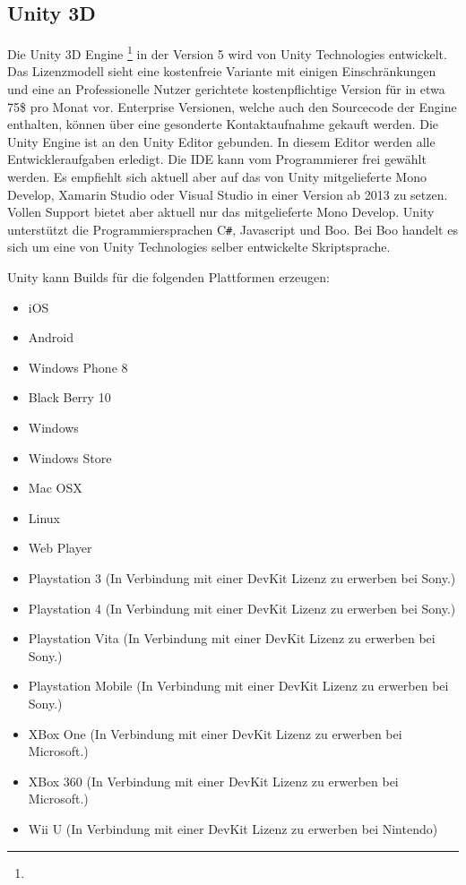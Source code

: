 \documentclass[pagesize, paper=a4, fontsize=12pt, titlepage=true, headings=small, headnosepline, abstractoff, liststotoc, nochapterprefix, plainheadsepline, twoside]{scrreprt}
\newcommand{\CS}{C\texttt{\#}}
\begin{document}
\subsection{Unity 3D}
Die Unity 3D Engine \footnote{} in der Version 5 wird von Unity Technologies entwickelt. Das Lizenzmodell sieht eine kostenfreie Variante mit einigen Einschränkungen und eine an Professionelle Nutzer gerichtete kostenpflichtige Version für in etwa 75\$ pro Monat vor. Enterprise Versionen, welche auch den Sourcecode der Engine enthalten, können über eine gesonderte Kontaktaufnahme gekauft werden. Die Unity Engine ist an den Unity Editor gebunden. In diesem Editor werden alle Entwickleraufgaben erledigt. Die IDE kann vom Programmierer frei gewählt werden. Es empfiehlt sich aktuell aber auf das von Unity mitgelieferte Mono Develop, Xamarin Studio oder Visual Studio in einer Version ab 2013 zu setzen. Vollen Support bietet aber aktuell nur das mitgelieferte Mono Develop. Unity unterstützt die Programmiersprachen \CS, Javascript und Boo. Bei Boo handelt es sich um eine von Unity Technologies selber entwickelte Skriptsprache.

Unity kann Builds für die folgenden Plattformen erzeugen:
\begin{itemize}
\item iOS
\item Android
\item Windows Phone 8
\item Black Berry 10
\item Windows
\item Windows Store
\item Mac OSX
\item Linux
\item Web Player
\item Playstation 3 (In Verbindung mit einer DevKit Lizenz zu erwerben bei Sony.)
\item Playstation 4 (In Verbindung mit einer DevKit Lizenz zu erwerben bei Sony.)
\item Playstation Vita (In Verbindung mit einer DevKit Lizenz zu erwerben bei Sony.)
\item Playstation Mobile (In Verbindung mit einer DevKit Lizenz zu erwerben bei Sony.)
\item XBox One (In Verbindung mit einer DevKit Lizenz zu erwerben bei Microsoft.)
\item XBox 360 (In Verbindung mit einer DevKit Lizenz zu erwerben bei Microsoft.)
\item Wii U  (In Verbindung mit einer DevKit Lizenz zu erwerben bei Nintendo)
\end{itemize}
\end{document}
